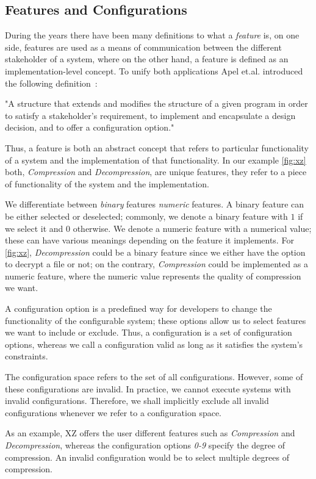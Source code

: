 \subsection{Features and Configurations}\label{feature-config}

During the years there have been many definitions to what a \emph{feature} is, on one side, features are used as a means of communication between
the different stakeholder of a system, where on the other hand, a feature is defined as an implementation-level concept. 
To unify both applications Apel et.al. introduced the following definition~\cite{Feature-Oriented-Software-Product-Lines}:

\begin{definition}
    "A structure that extends and modifies the structure of a
    given program in order to satisfy a stakeholder's requirement, to implement and
    encapsulate a design decision, and to offer a configuration option."     
\end{definition}

Thus, a feature is both an abstract concept that refers to particular functionality of a system and the implementation of that functionality.
In our example \autoref{fig:xz} both, \textit{Compression} and \textit{Decompression}, are unique features, they refer to a piece of functionality of the system and the
implementation. 

We differentiate between \emph{binary} features \emph{numeric} features. A binary feature can be either selected or deselected; 
commonly, we denote a binary feature with $1$ if we select it and $0$ otherwise. 
We denote a numeric feature with a numerical value; these can have various meanings depending on the feature it implements. 
For \autoref{fig:xz}, \textit{Decompression} could be a binary feature since we either have the option to decrypt a file or not; on the contrary, 
\textit{Compression} could be implemented as a numeric feature, where the numeric value represents the quality of compression we want. 

A configuration option is a predefined way for developers to change the functionality of the configurable system; 
these options allow us to select features we want to include or exclude. Thus, a configuration is a set of configuration options, whereas 
we call a configuration valid as long as it satisfies the system's constraints.

The configuration space refers to the set of all configurations. However, some of these configurations are invalid. 
In practice, we cannot execute systems with invalid configurations. 
Therefore, we shall implicitly exclude all invalid configurations whenever we refer to a configuration space.

As an example, \textsc{XZ} offers the user different features such as \textit{Compression} and \textit{Decompression}, whereas 
the configuration options \textit{0-9} specify the degree of compression. An invalid configuration would be to select multiple 
degrees of compression.
